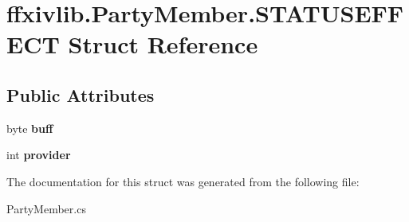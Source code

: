 \hypertarget{structffxivlib_1_1_party_member_1_1_s_t_a_t_u_s_e_f_f_e_c_t}{\section{ffxivlib.\-Party\-Member.\-S\-T\-A\-T\-U\-S\-E\-F\-F\-E\-C\-T Struct Reference}
\label{structffxivlib_1_1_party_member_1_1_s_t_a_t_u_s_e_f_f_e_c_t}
}
\subsection*{Public Attributes}
\begin{DoxyCompactItemize}
\item 
\hypertarget{structffxivlib_1_1_party_member_1_1_s_t_a_t_u_s_e_f_f_e_c_t_a0d9961f1d9c71b77fa872e6aee4d5787}{byte {\bfseries buff}}\label{structffxivlib_1_1_party_member_1_1_s_t_a_t_u_s_e_f_f_e_c_t_a0d9961f1d9c71b77fa872e6aee4d5787}

\item 
\hypertarget{structffxivlib_1_1_party_member_1_1_s_t_a_t_u_s_e_f_f_e_c_t_a123f3d9ee1d9db297df62737bdaf87c7}{int {\bfseries provider}}\label{structffxivlib_1_1_party_member_1_1_s_t_a_t_u_s_e_f_f_e_c_t_a123f3d9ee1d9db297df62737bdaf87c7}

\end{DoxyCompactItemize}


The documentation for this struct was generated from the following file\-:\begin{DoxyCompactItemize}
\item 
Party\-Member.\-cs\end{DoxyCompactItemize}
